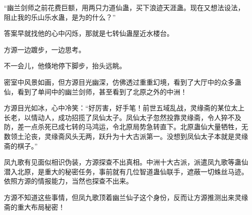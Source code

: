\begin{this_body}
“幽兰剑师之前花费巨额，用两只力道仙蛊，买下浪迹天涯蛊。现在又想法设法，阻止我的乐山乐水蛊，是为的什么？”

答案早就找他的心中闪烁，那就是七转仙蛊屋近水楼台。

方源一边踱步，一边思考。

不一会儿，他倏地停下脚步，抬头远眺。

密室中风景如画，但方源目光幽深，仿佛透过重重幻境，看到了大厅中的众多蛊仙，看到了单间中的幽兰剑师，甚至看到了北原之外的中洲！

方源目光如冰，心中冷笑：“好厉害，好手笔！前世五域乱战，灵缘斋的某位太上长老，以情动人，成功招揽了凤仙太子。凤仙太子忽然投靠灵缘斋，令人猝不及防，差一点杀死已成七转的马鸿运，令北原局势急转直下。北原蛊仙大量牺牲，无数领土沦丧，灵缘斋风头无两，跃升为十大古派第一。没想到凤仙太子本就是灵缘斋的棋子。”

凤九歌有见面似相识伪装，方源探查不出真相。中洲十大古派，派遣凤九歌等蛊仙潜入北原，是重大的秘密任务，事前就有几位智道蛊仙联手，遮蔽一切蛛丝马迹。依照方源的情报能力，当然也探查不出来。

方源不知道这些事情，但凤九歌顶着幽兰仙子这个身份，反而让方源推测出来灵缘斋的重大布局秘密！

\end{this_body}

